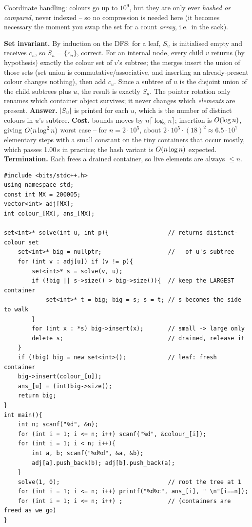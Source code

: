 Coordinate handling: colours go up to \(10^9\), but they are only ever
\emph{hashed or compared}, never indexed -- so no compression is needed here
(it becomes necessary the moment you swap the set for a count \emph{array},
i.e.\ in the sack).

\begin{proofbox}
\textbf{Set invariant.} By induction on the DFS: for a leaf, \(S_u\) is
initialised empty and receives \(c_u\), so \(S_u=\{c_u\}\), correct.  For an
internal node, every child \(v\) returns (by hypothesis) exactly the colour set
of \(v\)'s subtree; the merges insert the union of those sets (set union is
commutative/associative, and inserting an already-present colour changes
nothing), then add \(c_u\).  Since a subtree of \(u\) is the disjoint union of
the child subtrees plus \(u\), the result is exactly \(S_u\).  The pointer
rotation only renames which container object survives; it never changes which
\emph{elements} are present.  \textbf{Answer.} \(\lvert S_u\rvert\) is printed for
each \(u\), which is the number of distinct colours in \(u\)'s subtree.
\textbf{Cost.}  bounds moves by \(n\lceil\log_2 n\rceil\);
 insertion is \(O(\log n)\), giving \(O(n\log^2 n)\) worst
case -- for \(n=2\cdot10^5\), about \(2\cdot10^5\cdot(18)^2\approx6.5\cdot10^7\)
elementary steps with a small constant on the tiny containers that occur
mostly, which passes 1.00\,s in practice; the hash variant is
\(O(n\log n)\) expected.  \textbf{Termination.} Each  frees a
drained container, so live elements are always \(\le n\).
\end{proofbox}

\begin{lstlisting}[caption={CSES 1139 full solution (small-to-large set merge)}, label={lst:c28-dcolors-soln}]
#include <bits/stdc++.h>
using namespace std;
const int MX = 200005;
vector<int> adj[MX];
int colour_[MX], ans_[MX];

set<int>* solve(int u, int p){                 // returns distinct-colour set
    set<int>* big = nullptr;                   //   of u's subtree
    for (int v : adj[u]) if (v != p){
        set<int>* s = solve(v, u);
        if (!big || s->size() > big->size()){  // keep the LARGEST container
            set<int>* t = big; big = s; s = t; // s becomes the side to walk
        }
        for (int x : *s) big->insert(x);       // small -> large only
        delete s;                              // drained, release it
    }
    if (!big) big = new set<int>();            // leaf: fresh container
    big->insert(colour_[u]);
    ans_[u] = (int)big->size();
    return big;
}
int main(){
    int n; scanf("%d", &n);
    for (int i = 1; i <= n; i++) scanf("%d", &colour_[i]);
    for (int i = 1; i < n; i++){
        int a, b; scanf("%d%d", &a, &b);
        adj[a].push_back(b); adj[b].push_back(a);
    }
    solve(1, 0);                               // root the tree at 1
    for (int i = 1; i <= n; i++) printf("%d%c", ans_[i], " \n"[i==n]);
    for (int i = 1; i <= n; i++) ;             // (containers are freed as we go)
}
\end{lstlisting}

